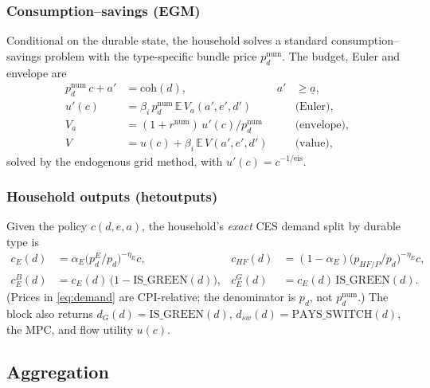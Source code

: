 \documentclass[11pt,a4paper]{article}
\newcommand{\E}{\mathbb{E}}
\newcommand{\num}{\mathrm{num}}
\newcommand{\pE}{p^{E}}
\newcommand{\coh}{\mathrm{coh}}
\begin{document}
\subsubsection{Consumption--savings (EGM)}

Conditional on the durable state, the household solves a standard
consumption--savings problem with the type-specific bundle price $p_d^{\num}$.
The budget, Euler and envelope are
\begin{align}
p_d^{\num}\,c + a' &= \coh(d), & a'&\ge \underline a, \label{eq:budget}\\
u'(c) &= \beta_i\,p_d^{\num}\,\E\,V_a(a',e',d') & &\text{(Euler)},\\
V_a &= (1+r^{\num})\,u'(c)/p_d^{\num} & &\text{(envelope)},\\
V &= u(c)+\beta_i\,\E\,V(a',e',d') & &\text{(value)},
\end{align}
solved by the endogenous grid method, with $u'(c)=c^{-1/\text{eis}}$.

\subsubsection{Household outputs (hetoutputs)}\label{sec:hetout}

Given the policy $c(d,e,a)$, the household's \emph{exact} CES demand split by
durable type is
\begin{align}
c_E(d) &= \alpha_E\bigl(\pE_d/p_d\bigr)^{-\eta_E} c, &
c_{HF}(d) &= (1-\alpha_E)\bigl(p_{HF/P}/p_d\bigr)^{-\eta_E} c, \label{eq:demand}\\
c_E^{B}(d) &= c_E(d)\,\bigl(1-\mathrm{IS\_GREEN}(d)\bigr), &
c_E^{G}(d) &= c_E(d)\,\mathrm{IS\_GREEN}(d).
\end{align}
(Prices in \eqref{eq:demand} are CPI-relative; the denominator is $p_d$, not
$p_d^{\num}$.) The block also returns $d_G(d)=\mathrm{IS\_GREEN}(d)$,
$d_{sw}(d)=\mathrm{PAYS\_SWITCH}(d)$, the MPC, and flow utility $u(c)$.

\subsection{Aggregation}\label{sec:agg}
\end{document}
